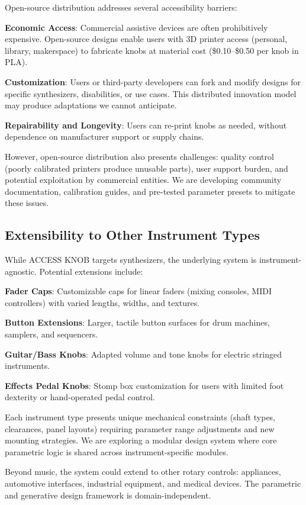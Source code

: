 \documentclass[sigconf]{nimeart}
\begin{document}
Open-source distribution addresses several accessibility barriers:

\textbf{Economic Access}: Commercial assistive devices are often prohibitively expensive. Open-source designs enable users with 3D printer access (personal, library, makerspace) to fabricate knobs at material cost (\$0.10--\$0.50 per knob in PLA).

\textbf{Customization}: Users or third-party developers can fork and modify designs for specific synthesizers, disabilities, or use cases. This distributed innovation model may produce adaptations we cannot anticipate.

\textbf{Repairability and Longevity}: Users can re-print knobs as needed, without dependence on manufacturer support or supply chains.

However, open-source distribution also presents challenges: quality control (poorly calibrated printers produce unusable parts), user support burden, and potential exploitation by commercial entities. We are developing community documentation, calibration guides, and pre-tested parameter presets to mitigate these issues.

\subsection{Extensibility to Other Instrument Types}

While ACCESS KNOB targets synthesizers, the underlying system is instrument-agnostic. Potential extensions include:

\textbf{Fader Caps}: Customizable caps for linear faders (mixing consoles, MIDI controllers) with varied lengths, widths, and textures.

\textbf{Button Extensions}: Larger, tactile button surfaces for drum machines, samplers, and sequencers.

\textbf{Guitar/Bass Knobs}: Adapted volume and tone knobs for electric stringed instruments.

\textbf{Effects Pedal Knobs}: Stomp box customization for users with limited foot dexterity or hand-operated pedal control.

Each instrument type presents unique mechanical constraints (shaft types, clearances, panel layouts) requiring parameter range adjustments and new mounting strategies. We are exploring a modular design system where core parametric logic is shared across instrument-specific modules.

Beyond music, the system could extend to other rotary controls: appliances, automotive interfaces, industrial equipment, and medical devices. The parametric and generative design framework is domain-independent.
\end{document}
